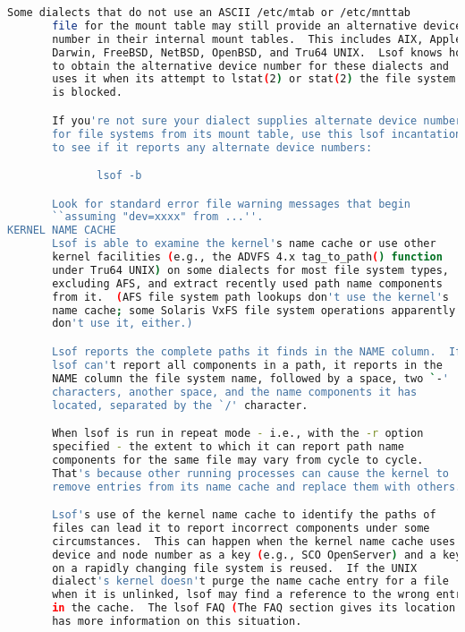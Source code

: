 {{\begin{lstlisting}[language=bash]
       Some dialects that do not use an ASCII /etc/mtab or /etc/mnttab
       file for the mount table may still provide an alternative device
       number in their internal mount tables.  This includes AIX, Apple
       Darwin, FreeBSD, NetBSD, OpenBSD, and Tru64 UNIX.  Lsof knows how
       to obtain the alternative device number for these dialects and
       uses it when its attempt to lstat(2) or stat(2) the file system
       is blocked.

       If you're not sure your dialect supplies alternate device numbers
       for file systems from its mount table, use this lsof incantation
       to see if it reports any alternate device numbers:

              lsof -b

       Look for standard error file warning messages that begin
       ``assuming "dev=xxxx" from ...''.
KERNEL NAME CACHE
       Lsof is able to examine the kernel's name cache or use other
       kernel facilities (e.g., the ADVFS 4.x tag_to_path() function
       under Tru64 UNIX) on some dialects for most file system types,
       excluding AFS, and extract recently used path name components
       from it.  (AFS file system path lookups don't use the kernel's
       name cache; some Solaris VxFS file system operations apparently
       don't use it, either.)

       Lsof reports the complete paths it finds in the NAME column.  If
       lsof can't report all components in a path, it reports in the
       NAME column the file system name, followed by a space, two `-'
       characters, another space, and the name components it has
       located, separated by the `/' character.

       When lsof is run in repeat mode - i.e., with the -r option
       specified - the extent to which it can report path name
       components for the same file may vary from cycle to cycle.
       That's because other running processes can cause the kernel to
       remove entries from its name cache and replace them with others.

       Lsof's use of the kernel name cache to identify the paths of
       files can lead it to report incorrect components under some
       circumstances.  This can happen when the kernel name cache uses
       device and node number as a key (e.g., SCO OpenServer) and a key
       on a rapidly changing file system is reused.  If the UNIX
       dialect's kernel doesn't purge the name cache entry for a file
       when it is unlinked, lsof may find a reference to the wrong entry
       in the cache.  The lsof FAQ (The FAQ section gives its location.)
       has more information on this situation.


\end{lstlisting}}}
